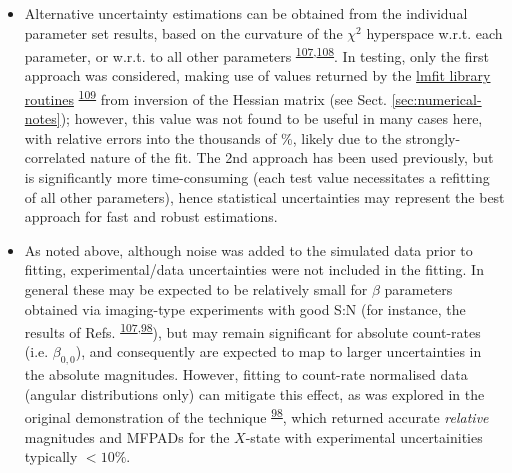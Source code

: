 \documentclass[10pt]{article}
\begin{document}
\begin{itemize}
\item Alternative uncertainty estimations can be obtained from the individual parameter set results, based on the curvature of the $\chi^2$ hyperspace w.r.t. each parameter, or w.r.t. to all other parameters \textsuperscript{\hyperref[csl:107]{107},\hyperref[csl:108]{108}}. In testing, only the first approach was considered, making use of values returned by the \href{https://lmfit.github.io/lmfit-py/fitting.html#uncertainties-in-variable-parameters-and-their-correlations}{lmfit library routines} \textsuperscript{\hyperref[csl:109]{109}} from inversion of the Hessian matrix (see Sect. \ref{sec:numerical-notes}); however, this value was not found to be useful in many cases here, with relative errors into the thousands of \%, likely due to the strongly-correlated nature of the fit. The 2nd approach has been used previously, but is significantly more time-consuming (each test value necessitates a refitting of all other parameters), hence statistical uncertainties may represent the best approach for fast and robust estimations.
\item As noted above, although noise was added to the simulated data prior to fitting, experimental/data uncertainties were not included in the fitting. In general these may be expected to be relatively small for $\beta$ parameters obtained via imaging-type experiments with good S:N (for instance, the results of Refs. \textsuperscript{\hyperref[csl:107]{107},\hyperref[csl:98]{98}}), but may remain significant for absolute count-rates (i.e. $\beta_{0,0}$), and consequently are expected to map to larger uncertainties in the absolute magnitudes. However, fitting to count-rate normalised data (angular distributions only) can mitigate this effect, as was explored in the original demonstration of the technique \textsuperscript{\hyperref[csl:98]{98}}, which returned accurate \textit{relative} magnitudes and MFPADs for the $X$-state with experimental uncertainities typically $<10\%$.
\end{itemize}




\end{document}
